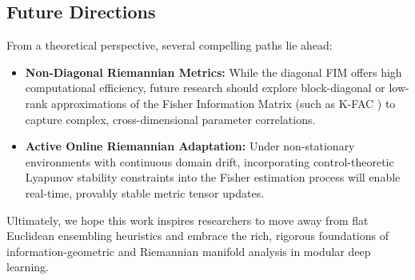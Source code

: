 \subsection{Future Directions} From a theoretical perspective, several compelling paths lie ahead:
\begin{itemize}\setlength{\itemsep}{0.5pt}\setlength{\parskip}{0pt}
    \item \textbf{Non-Diagonal Riemannian Metrics:} While the diagonal FIM offers high computational efficiency, future research should explore block-diagonal or low-rank approximations of the Fisher Information Matrix (such as K-FAC \cite{martens2015optimizing}) to capture complex, cross-dimensional parameter correlations.
    \item \textbf{Active Online Riemannian Adaptation:} Under non-stationary environments with continuous domain drift, incorporating control-theoretic Lyapunov stability constraints into the Fisher estimation process will enable real-time, provably stable metric tensor updates.
\end{itemize}
Ultimately, we hope this work inspires researchers to move away from flat Euclidean ensembling heuristics and embrace the rich, rigorous foundations of information-geometric and Riemannian manifold analysis in modular deep learning.
